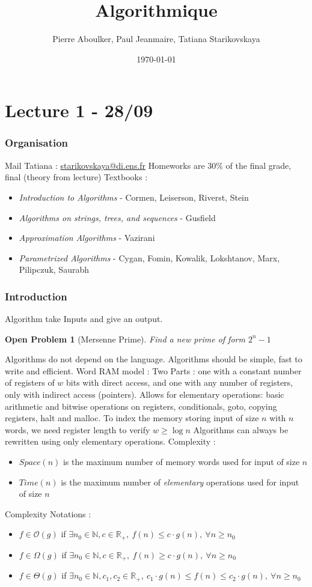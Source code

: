 \documentclass{cours}
\title{Algorithmique}
\author{Pierre Aboulker, Paul Jeanmaire, Tatiana Starikovskaya}
\date{\today}
\newtheorem{openpb}{Open Problem}
\begin{document}
\part[First Algorithms]{Lecture 1 - 28/09}
\localtableofcontents
\section{Organisation}
Mail Tatiana : \url{starikovskaya@di.ens.fr}
Homeworks are 30\% of the final grade, final (theory from lecture)
Textbooks : 
\begin{itemize}
    \item \textsl{Introduction to Algorithms} - Cormen, Leiserson, Riverst, Stein
    \item \textsl{Algorithms on strings, trees, and sequences} - Gusfield
    \item \textsl{Approximation Algorithms} - Vazirani
    \item \textsl{Parametrized Algorithms} - Cygan, Fomin, Kowalik, Lokshtanov, Marx, Pilipczuk, Saurabh
\end{itemize}

\section{Introduction}
Algorithm take Inputs and give an output.
\begin{openpb}[Mersenne Prime]
    Find a new prime of form $2^{n} - 1$
\end{openpb}
Algorithms do not depend on the language. Algorithms should be simple, fast to write and efficient.
Word RAM model : Two Parts : one with a constant number of registers of $w$ bits with direct access, and one with any number of registers, only with indirect access (pointers). 
Allows for elementary operations: basic arithmetic and bitwise operations on registers, conditionals, goto, copying registers, halt and malloc. 
To index the memory storing input of size $n$ with $n$ words, we need register length to verify $w \geq \log n$
Algorithms can always be rewritten using only elementary operations. 
Complexity : 
\begin{itemize}
    \item $Space(n)$ is the maximum number of memory words used for input of size $n$
    \item $Time(n)$ is the maximum number of \textsl{elementary} operations used for input of size $n$
\end{itemize}
Complexity Notations : 
\begin{itemize}
    \item $f \in \mathcal{O}(g)$ if $\exists n_0 \in \mathbb{N}, c \in \mathbb{R}_{+},\ f(n) \leq c \cdot g(n), \ \forall n \geq n_0$
    \item $f \in \Omega(g)$ if $\exists n_0 \in \mathbb{N}, c \in \mathbb{R}_{+},\ f(n) \geq c \cdot g(n), \ \forall n \geq n_0$
    \item $f \in \Theta(g)$ if $\exists n_0 \in \mathbb{N}, c_{1}, c_{2} \in \mathbb{R}_{+},\ c_{1} \cdot g(n) \leq f(n) \leq c_{2} \cdot g(n), \ \forall n \geq n_0$
\end{itemize}
\end{document}
